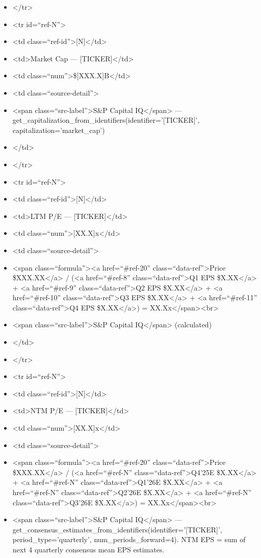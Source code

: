 \documentclass[11pt]{article}
\begin{document}
\begin{itemize}[leftmargin=*,itemsep=2pt,topsep=2pt]
\item {} </tr>
\item {} <tr id=``ref-N''>
\item {} <td class=``ref-id''>[N]</td>
\item {} <td>Market Cap — [TICKER]</td>
\item {} <td class=``num''>\$[XXX.X]B</td>
\item {} <td class=``source-detail''>
\item {} <span class=``src-label''>S\&P Capital IQ</span> — get\_\allowbreak{}capitalization\_\allowbreak{}from\_\allowbreak{}identifiers(identifier='[TICKER]', capitalization='market\_\allowbreak{}cap')
\item {} </td>
\item {} </tr>
\item {} <tr id=``ref-N''>
\item {} <td class=``ref-id''>[N]</td>
\item {} <td>LTM P/E — [TICKER]</td>
\item {} <td class=``num''>[XX.X]x</td>
\item {} <td class=``source-detail''>
\item {} <span class=``formula''><a href=``\#ref-20'' class=``data-ref''>Price \$XXX.XX</a> / (<a href=``\#ref-8'' class=``data-ref''>Q1 EPS \$X.XX</a> + <a href=``\#ref-9'' class=``data-ref''>Q2 EPS \$X.XX</a> + <a href=``\#ref-10'' class=``data-ref''>Q3 EPS \$X.XX</a> + <a href=``\#ref-11'' class=``data-ref''>Q4 EPS \$X.XX</a>) = XX.Xx</span><br>
\item {} <span class=``src-label''>S\&P Capital IQ</span> (calculated)
\item {} </td>
\item {} </tr>
\item {} <tr id=``ref-N''>
\item {} <td class=``ref-id''>[N]</td>
\item {} <td>NTM P/E — [TICKER]</td>
\item {} <td class=``num''>[XX.X]x</td>
\item {} <td class=``source-detail''>
\item {} <span class=``formula''><a href=``\#ref-20'' class=``data-ref''>Price \$XXX.XX</a> / (<a href=``\#ref-N'' class=``data-ref''>Q4'25E \$X.XX</a> + <a href=``\#ref-N'' class=``data-ref''>Q1'26E \$X.XX</a> + <a href=``\#ref-N'' class=``data-ref''>Q2'26E \$X.XX</a> + <a href=``\#ref-N'' class=``data-ref''>Q3'26E \$X.XX</a>) = XX.Xx</span><br>
\item {} <span class=``src-label''>S\&P Capital IQ</span> — get\_\allowbreak{}consensus\_\allowbreak{}estimates\_\allowbreak{}from\_\allowbreak{}identifiers(identifier='[TICKER]', period\_\allowbreak{}type='quarterly', num\_\allowbreak{}periods\_\allowbreak{}forward=4). NTM EPS = sum of next 4 quarterly consensus mean EPS estimates.

\end{itemize}
\end{document}
